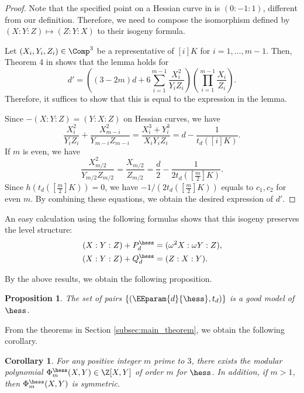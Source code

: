 \documentclass{amsart}
\newtheorem{proposition}[theorem]{Proposition}
\newtheorem{corollary}[theorem]{Corollary}
\theoremstyle{definition}
\theoremstyle{remark}
\numberwithin{equation}{section}
\begin{document}
\begin{proof}
    Note that the specified point on a Hessian curve in \cite{BDFM2021}
    is $(0:-1:1)$, different from our definition.
    Therefore, we need to compose the isomorphism
    defined by $(X:Y:Z) \mapsto (Z:Y:X)$
    to their isogeny formula.

    Let $(X_i, Y_i, Z_i) \in \Comp^3$ be a representative of $[i]K$ for $i = 1, \dots, m - 1$.
    Then,
    Theorem 4 in \cite{BDFM2021} shows that the lemma holds for
    \begin{equation*}
        d' = \left(
                (3 - 2m)d + 6\sum_{i=1}^{m - 1}
                    \frac{X_i^2}{Y_i Z_i}
            \right)
            \left(
                \prod_{i=1}^{m - 1}
                \frac{X_i}{Z_i}
            \right).
    \end{equation*}
    Therefore, it suffices to show that
    this is equal to the expression in the lemma.

    Since $-(X:Y:Z) = (Y:X:Z)$ on Hessian curves,
    we have
    \begin{equation*}
        \frac{X_i^2}{Y_i Z_i} + \frac{X_{m - i}^2}{Y_{m - i} Z_{m - i}}
        = \frac{X_i^3 + Y_i^3}{X_i Y_i Z_i}
        = d - \frac{1}{t_d([i]K)}.
    \end{equation*}
    If $m$ is even, we have
    \begin{equation*}
        \frac{X_{m/2}^2}{Y_{m/2} Z_{m/2}} = \frac{X_{m/2}}{Z_{m/2}} = \frac{d}{2} - \frac{1}{2t_d\left(\left[\frac{m}{2}\right]K\right)}.
    \end{equation*}
    Since $h(t_d([\frac{m}{2}]K)) = 0$, we have $-1/(2t_d([\frac{m}{2}]K))$ equals
    to $c_1, c_2$ for even $m$.
    By combining these equations,
    we obtain the desired expression of $d'$.
\end{proof}
An easy calculation using the following formulas
shows that this isogeny preserves the level structure:
\begin{align*}
    (X:Y:Z) + P^\hess_d &= (\omega^2 X : \omega Y : Z),\\
    (X:Y:Z) + Q^\hess_d &= (Z : X :Y).
\end{align*}

By the above results,
we obtain the following proposition.
\begin{proposition}
    The set of pairs
    $\{(\EEparam{d}{\hess}, t_d)\}$
    is a good model of $\hess$.
\end{proposition}

From the theorems in Section \ref{subsec:main_theorem},
we obtain the following corollary.
\begin{corollary}
    For any positive integer $m$ prime to $3$,
    there exists the modular polynomial $\Phi_m^{\hess}(X, Y) \in \Z[X, Y]$
    of order $m$ for $\hess$.
    In addition,
    if $m > 1$, then $\Phi_m^{\hess}(X, Y)$ is symmetric.
\end{corollary}
\end{document}

